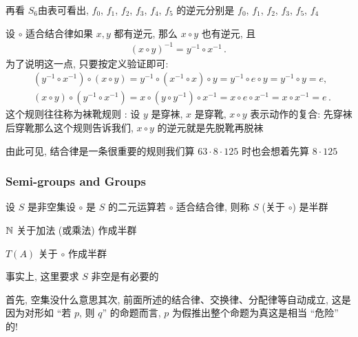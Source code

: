 \begin{example}
    再看 $S_6$\period 由表可看出, $f_0$, $f_1$, $f_2$, $f_3$, $f_4$, $f_5$ 的逆元分别是 $f_0$, $f_1$, $f_2$, $f_3$, $f_5$, $f_4$\period
\end{example}

\begin{remark}
    设 $\circ$ 适合结合律\period 如果 $x,y$ 都有逆元, 那么 $x \circ y$ 也有逆元, 且
    \begin{align*}
        (x \circ y)^{-1} = y^{-1} \circ x^{-1} \period
    \end{align*}
    为了说明这一点, 只要按定义验证即可:
    \begin{align*}
         & (y^{-1} \circ x^{-1}) \circ (x \circ y) = y^{-1} \circ (x^{-1} \circ x) \circ y = y^{-1} \circ e \circ y = y^{-1} \circ y = e,        \\
         & (x \circ y) \circ (y^{-1} \circ x^{-1}) = x \circ (y \circ y^{-1}) \circ x^{-1} = x \circ e \circ x^{-1} = x \circ x^{-1} = e \period
    \end{align*}
    这个规则往往称为袜靴规则 : 设 $y$ 是穿袜, $x$ 是穿靴, $x \circ y$ 表示动作的复合: 先穿袜后穿靴\period 那么这个规则告诉我们, $x \circ y$ 的逆元就是先脱靴再脱袜\period
\end{remark}

\begin{remark}
    由此可见, 结合律是一条很重要的规则\period 我们算 $63 \cdot 8 \cdot 125$ 时也会想着先算 $8 \cdot 125$\period
\end{remark}

\subsubsection*{Semi-groups and Groups}

\begin{definition}
    设 $S$ 是非空集\period 设 $\circ$ 是 $S$ 的二元运算\period 若 $\circ$ 适合结合律, 则称 $S$ (关于 $\circ$) 是半群 \period
\end{definition}

\begin{example}
    $\mathbb{N}$ 关于加法 (或乘法) 作成半群\period
\end{example}

\begin{example}
    $T(A)$ 关于 $\circ$ 作成半群\period
\end{example}

\begin{remark}
    事实上, 这里要求 $S$ 非空是有必要的\period

    首先, 空集没什么意思\period 其次, 前面所述的结合律、交换律、分配律等自动成立, 这是因为对形如 ``若 $p$, 则 $q$'' 的命题而言, $p$ 为假推出整个命题为真\period 这是相当 ``危险'' 的!
\end{remark}

